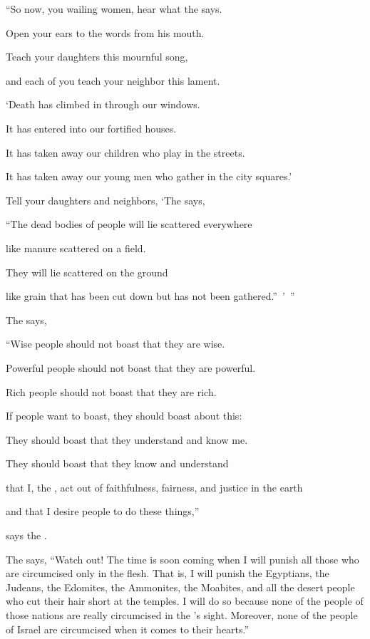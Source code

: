 {\par }{\Q “So now, you wailing women,
hear
what
the {}
says.

\par }{\Q Open
your ears
to the words
from his mouth.
\par }{\Q Teach
your daughters
this mournful
song,
\par }{\Q and each of you teach your neighbor
this lament.
\par }{\Q {}‘Death
has climbed
in through our windows.
\par }{\Q It has entered
into our fortified houses.
\par }{\Q It has taken
away our children who play
in the streets.
\par }{\Q It has taken away our young men
who gather in the city squares.’
\par }{\Q {}Tell
your daughters and neighbors, ‘The
{}
says,
\par }{\Q “The dead bodies
of people
will lie scattered
everywhere
\par }{\Q like manure
scattered on
a field.
\par }{\Q They will lie scattered on the ground
\par }{\Q like grain
that has been cut down
but has not
been gathered.” ’ ”
\par }{\PP The
{}
says,
\par }{\Q “Wise people
should not
boast
that they are wise.
\par }{\Q Powerful people
should not
boast
that they are powerful.
\par }{\Q Rich people
should not
boast
that they are rich.
\par }{\Q {}If
people want to boast,
they should boast about this:
\par }{\Q They should boast
that they understand
and know
me.
\par }{\Q They should boast that they know and understand
\par }{\Q that
I,
the {}, act
out of faithfulness,
fairness,
and justice
in the earth
\par }{\Q and that
I desire
people to do these
things,”

\par }{\PP says
the {}.
\par }{\PP {}The
{}
says,
“Watch
out! The time
is soon coming when
I will punish
all
those who are circumcised only in the flesh.
That is, I will punish the Egyptians,
the Judeans,
the Edomites,
the Ammonites,
the Moabites,
and all
the desert
people
who cut
their hair
short
at the temples.
I will do so because
none
of the people
of those nations
are really circumcised
in the
{}’s sight. Moreover, none
of the people
of Israel
are circumcised
when it comes to their hearts.”

}
